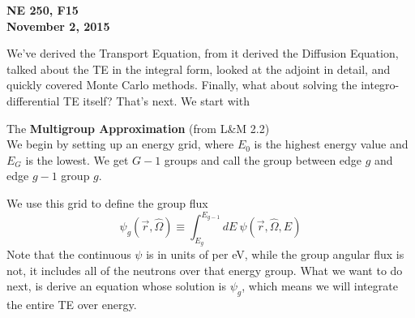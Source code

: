 \documentclass[12pt]{article}
\newcommand{\vecr}{\ensuremath{\vec{r}}}
\newcommand{\vOmega}{\ensuremath{\hat{\Omega}}}
\begin{document}
\begin{center}
{\bf NE 250, F15\\
November 2, 2015 
}
\end{center}

We've derived the Transport Equation, from it derived the Diffusion Equation, talked about the TE in the integral form, looked at the adjoint in detail, and quickly covered Monte Carlo methods. Finally, what about solving the integro-differential TE itself? That's next. We start with

The \textbf{Multigroup Approximation} (from L\&M 2.2)\\
We begin by setting up an energy grid, where $E_0$ is the highest energy value and $E_G$ is the lowest. We get $G-1$ groups and call the group between edge $g$ and edge $g-1$ group $g$. 

\begin{center}
\end{center}

We use this grid to define the group flux
\[
\psi_g(\vecr, \vOmega) \equiv \int_{E_g}^{E_{g-1}} dE\: \psi(\vecr, \vOmega, E)
\]
Note that the continuous $\psi$ is in units of per eV, while the group angular flux is not, it includes all of the neutrons over that energy group. What we want to do next, is derive an equation whose solution is $\psi_g$, which means we will integrate the entire TE over energy. 
\end{document}
